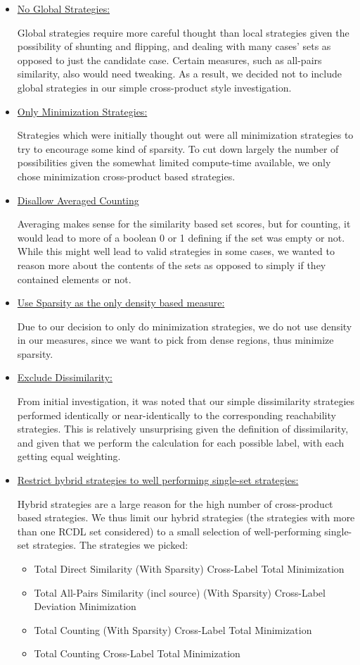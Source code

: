 \documentclass[a4paper,11pt]{report}
\begin{document}
\begin{itemize}
	\item \underline{No Global Strategies:}
	
	Global strategies require more careful thought than local strategies given the possibility of shunting and flipping, and dealing with many cases' sets as opposed to just the candidate case. Certain measures, such as all-pairs similarity, also would need tweaking. As a result, we decided not to include global strategies in our simple cross-product style investigation.
    \item \underline{Only Minimization Strategies:}
    
    Strategies which were initially thought out were all minimization strategies to try to encourage some kind of sparsity. To cut down largely the number of possibilities given the somewhat limited compute-time available, we only chose minimization cross-product based strategies.
    \item \underline{Disallow Averaged Counting}
    
    Averaging makes sense for the similarity based set scores, but for counting, it would lead to more of a boolean 0 or 1 defining if the set was empty or not. While this might well lead to valid strategies in some cases, we wanted to reason more about the contents of the sets as opposed to simply if they contained elements or not. 
    \item \underline{Use Sparsity as the only density based measure:}
    
    Due to our decision to only do minimization strategies, we do not use density in our measures, since we want to pick from dense regions, thus minimize sparsity.
    \item \underline{Exclude Dissimilarity:}
    
    From initial investigation, it was noted that our simple dissimilarity strategies performed identically or near-identically to the corresponding reachability strategies. This is relatively unsurprising given the definition of dissimilarity, and given that we perform the calculation for each possible label, with each getting equal weighting.
    \item \underline{Restrict hybrid strategies to well performing single-set strategies:}
    
    Hybrid strategies are a large reason for the high number of cross-product based strategies. We thus limit our hybrid strategies (the strategies with more than one RCDL set considered) to a small selection of well-performing single-set strategies. The strategies we picked:
    \begin{itemize}
        \item Total Direct Similarity (With Sparsity) Cross-Label Total Minimization
        \item Total All-Pairs Similarity (incl source) (With Sparsity) Cross-Label Deviation Minimization
        \item Total Counting (With Sparsity) Cross-Label Total Minimization
        \item Total Counting Cross-Label Total Minimization
    \end{itemize}
\end{itemize}
\end{document}
